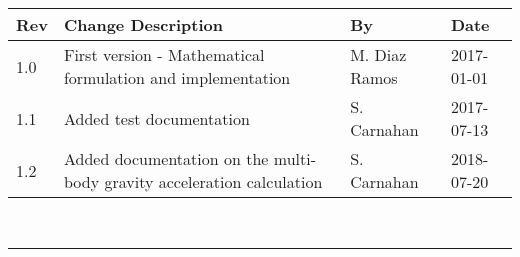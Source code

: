 \documentclass[]{BasiliskReportMemo}
\begin{document}
\makeCover

%
%
\pagestyle{empty}
\clearpage
{\renewcommand{\arraystretch}{2}
	\noindent
	\begin{longtable}{|p{0.5in}|p{3.5in}|p{1.07in}|p{0.9in}|}
		\hline
		{\bfseries Rev} & {\bfseries Change Description} & {\bfseries By}& {\bfseries Date} \\
		\hline
		1.0 & First version - Mathematical formulation and implementation & M. Diaz Ramos & 2017-01-01\\
		\hline
		1.1 & Added test documentation & S. Carnahan &2017-07-13\\
		\hline
		1.2 & Added documentation on the multi-body gravity acceleration calculation & S. Carnahan &2018-07-20\\
		\hline
		
	\end{longtable}
}

\setcounter{page}{1}
\pagestyle{fancy}

\tableofcontents %
~\\ \hrule ~\\ %
	









\end{document}
